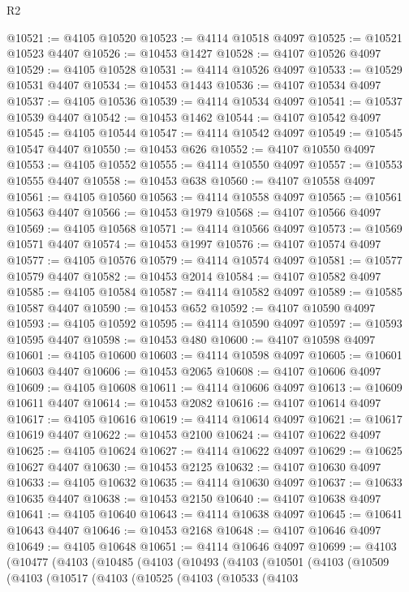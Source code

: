 \begin{lexlean}{R2}
\begin{coremodule}
@10521 := @4105 @10520
@10523 := @4114 @10518 @4097
@10525 := @10521 @10523 @4407
@10526 := @10453 @1427
@10528 := @4107 @10526 @4097
@10529 := @4105 @10528
@10531 := @4114 @10526 @4097
@10533 := @10529 @10531 @4407
@10534 := @10453 @1443
@10536 := @4107 @10534 @4097
@10537 := @4105 @10536
@10539 := @4114 @10534 @4097
@10541 := @10537 @10539 @4407
@10542 := @10453 @1462
@10544 := @4107 @10542 @4097
@10545 := @4105 @10544
@10547 := @4114 @10542 @4097
@10549 := @10545 @10547 @4407
@10550 := @10453 @626
@10552 := @4107 @10550 @4097
@10553 := @4105 @10552
@10555 := @4114 @10550 @4097
@10557 := @10553 @10555 @4407
@10558 := @10453 @638
@10560 := @4107 @10558 @4097
@10561 := @4105 @10560
@10563 := @4114 @10558 @4097
@10565 := @10561 @10563 @4407
@10566 := @10453 @1979
@10568 := @4107 @10566 @4097
@10569 := @4105 @10568
@10571 := @4114 @10566 @4097
@10573 := @10569 @10571 @4407
@10574 := @10453 @1997
@10576 := @4107 @10574 @4097
@10577 := @4105 @10576
@10579 := @4114 @10574 @4097
@10581 := @10577 @10579 @4407
@10582 := @10453 @2014
@10584 := @4107 @10582 @4097
@10585 := @4105 @10584
@10587 := @4114 @10582 @4097
@10589 := @10585 @10587 @4407
@10590 := @10453 @652
@10592 := @4107 @10590 @4097
@10593 := @4105 @10592
@10595 := @4114 @10590 @4097
@10597 := @10593 @10595 @4407
@10598 := @10453 @480
@10600 := @4107 @10598 @4097
@10601 := @4105 @10600
@10603 := @4114 @10598 @4097
@10605 := @10601 @10603 @4407
@10606 := @10453 @2065
@10608 := @4107 @10606 @4097
@10609 := @4105 @10608
@10611 := @4114 @10606 @4097
@10613 := @10609 @10611 @4407
@10614 := @10453 @2082
@10616 := @4107 @10614 @4097
@10617 := @4105 @10616
@10619 := @4114 @10614 @4097
@10621 := @10617 @10619 @4407
@10622 := @10453 @2100
@10624 := @4107 @10622 @4097
@10625 := @4105 @10624
@10627 := @4114 @10622 @4097
@10629 := @10625 @10627 @4407
@10630 := @10453 @2125
@10632 := @4107 @10630 @4097
@10633 := @4105 @10632
@10635 := @4114 @10630 @4097
@10637 := @10633 @10635 @4407
@10638 := @10453 @2150
@10640 := @4107 @10638 @4097
@10641 := @4105 @10640
@10643 := @4114 @10638 @4097
@10645 := @10641 @10643 @4407
@10646 := @10453 @2168
@10648 := @4107 @10646 @4097
@10649 := @4105 @10648
@10651 := @4114 @10646 @4097
@10699 := @4103
    (@10477
      (@4103
        (@10485
          (@4103
            (@10493
              (@4103
                (@10501
                  (@4103
                    (@10509
                      (@4103
                        (@10517
                          (@4103
                            (@10525
                              (@4103
                                (@10533
                                  (@4103

\end{coremodule}
\end{lexlean}
